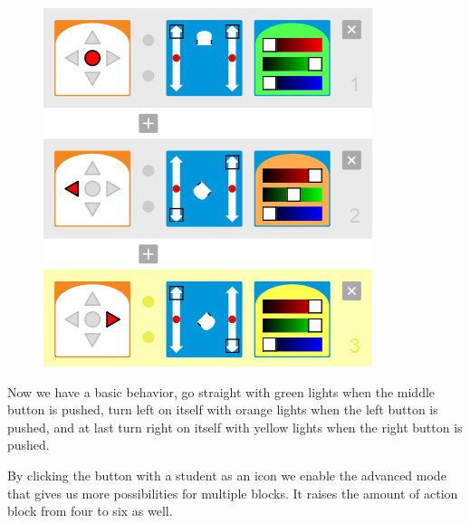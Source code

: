 \documentclass{scrartcl}
\begin{document}
\begin{figure}[h!]
  \includegraphics[width=\textwidth]{./VPL/middlebtn_3E}
  \label{fig:thymio_vpl_middlebtn_3e6a}
\end{figure}
Now we have a basic behavior, go straight with green lights when the middle button is pushed, turn left on itself with orange lights when the left button is pushed, 
and at last turn right on itself with yellow lights when the right button is pushed.

By clicking the button with a student as an icon we enable the advanced mode that gives us more possibilities for multiple blocks. It raises the amount of action block from four to six as well. 
\end{document}
